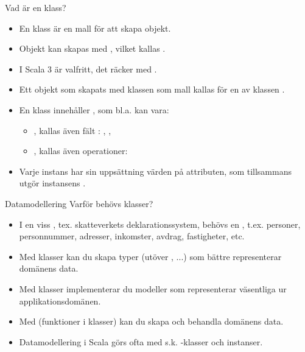 \begin{Slide}{Vad är en klass?}
\begin{itemize}
\item En klass är en mall  för att skapa objekt.
\item Objekt kan skapas med , vilket kallas . 
\item I Scala 3 är  valfritt, det räcker med . 
\item Ett objekt som skapats med klassen  som mall kallas för en  av klassen .
\item En klass innehåller  , som bl.a. kan vara:
  \begin{itemize}
  \item {}, kallas även fält : , , 
  \item {}, kallas även operationer: 
  \end{itemize}
\item Varje instans har sin  uppsättning värden på attributen, som tillsammans utgör instansens .
\end{itemize}

\end{Slide}
  

\begin{Slide}{Datamodellering}
Varför behövs klasser? 
\begin{itemize}
\item I en viss  , tex. skatteverkets deklarationssystem, behövs en , t.ex. personer, personnummer, adresser, inkomster, avdrag, fastigheter, etc.
\item Med klasser kan du skapa  typer (utöver ,  ...) som bättre representerar domänens data.
\item Med klasser implementerar du modeller som representerar väsentliga  ur applikationsdomänen. 
\item Med  (funktioner i klasser) kan du skapa och behandla domänens data.
\item Datamodellering i Scala görs ofta med s.k. -klasser och  instanser.
\end{itemize}
\end{Slide}

